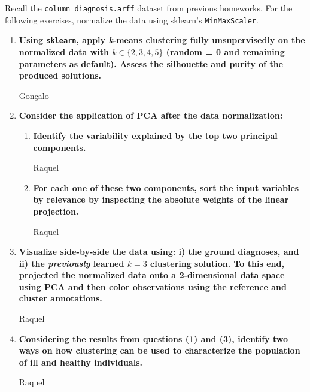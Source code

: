 \documentclass[12pt]{article}
\begin{document}
\noindent Recall the \texttt{column\_diagnosis.arff} dataset from previous homeworks. For the following exercises,
normalize the data using sklearn's \texttt{MinMaxScaler}.

\begin{enumerate}[leftmargin=\labelsep]
    \item \textbf{Using \texttt{sklearn}, apply \textit{k}-means clustering fully unsupervisedly on the normalized data with
          $k \in \{2,3,4,5\}$ (\textnormal{random = 0} and remaining parameters as default). Assess the silhouette and purity of the produced solutions.}

          \vskip 0.3cm
          Gonçalo

    \item \textbf{Consider the application of PCA after the data normalization:}

    \begin{enumerate}
        \item \textbf{Identify the variability explained by the top two principal components.}

              \vskip 0.3cm
              Raquel

        \item \textbf{For each one of these two components, sort the input variables by relevance by
              inspecting the absolute weights of the linear projection.}

              \vskip 0.3cm
              Raquel
    \end{enumerate}

    \item \textbf{Visualize side-by-side the data using: i) the ground diagnoses, and ii) the \textit{previously} learned
          $k = 3$ clustering solution. To this end, projected the normalized data onto a 2-dimensional data
          space using PCA and then color observations using the reference and cluster annotations.}

          \vskip 0.3cm
          Raquel

    \item \textbf{Considering the results from questions (1) and (3), identify two ways on how clustering can
          be used to characterize the population of ill and healthy individuals.}

          \vskip 0.3cm
          Raquel
\end{enumerate}
\end{document}
